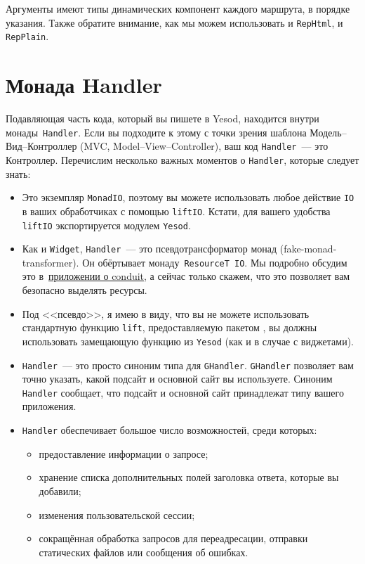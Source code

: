 Аргументы имеют типы динамических компонент каждого маршрута, в порядке
указания. Также обратите внимание, как мы можем использовать и
\lstinline!RepHtml!, и \lstinline!RepPlain!.

\section{Монада Handler}\label{sec:handler-monad}
Подавляющая часть кода, который вы пишете в Yesod, находится внутри
монады~\lstinline!Handler!. Если вы подходите к этому с точки зрения
шаблона Модель--Вид--Контроллер (MVC, Model--View--Controller), ваш код
\lstinline!Handler!~--- это Контроллер. Перечислим несколько важных
моментов о \lstinline!Handler!, которые следует знать:
\begin{itemize}
\item Это экземпляр \lstinline!MonadIO!, поэтому вы можете
  использовать любое действие \lstinline!IO! в ваших обработчиках с
  помощью \lstinline!liftIO!. Кстати, для вашего удобства \lstinline!liftIO! экспортируется
  модулем \lstinline!Yesod!.
\item Как и \lstinline!Widget!, \lstinline!Handler!~--- это псевдотрансформатор
    монад (fake-monad-transformer). Он обёртывает монаду~\lstinline!ResourceT IO!.
    Мы подробно обсудим это в~\hyperref[chap:conduit]{приложении о conduit}, а
    сейчас только скажем, что это позволяет вам безопасно выделять ресурсы.
\item Под <<псевдо>>, я имею в виду, что вы не можете использовать
  стандартную функцию \lstinline!lift!, предоставляемую пакетом
  ,
  вы должны использовать замещающую функцию из \lstinline!Yesod! (как и в
  случае с виджетами).
\item \lstinline!Handler!~--- это просто синоним типа для
  \lstinline!GHandler!. \lstinline!GHandler! позволяет вам точно
  указать, какой подсайт и основной сайт вы используете. Синоним
  \lstinline!Handler! сообщает, что подсайт и основной сайт
  принадлежат типу вашего приложения.
\item \lstinline!Handler! обеспечивает большое число возможностей, среди которых:
\begin{itemize}
\item предоставление информации о запросе;
\item хранение списка дополнительных полей заголовка ответа, которые
  вы добавили;
\item изменения пользовательской сессии;
\item сокращённая обработка запросов для переадресации, отправки
  статических файлов или сообщения об ошибках.
\end{itemize}
\end{itemize}

